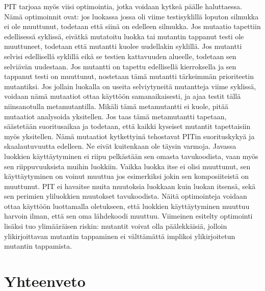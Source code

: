 \documentclass{tktltiki}
\begin{document}
PIT tarjoaa myös viisi optimointia, jotka voidaan kytkeä päälle haluttaessa. Nämä optimoinnit ovat: jos luokassa jossa oli viime testisyklillä loputon silmukka ei ole muuttunut, todetaan että siinä on edelleen silmukka. Jos mutaatio tapettiin edellisessä syklissä, eivätkä mutatoitu luokka tai mutantin tappanut testi ole muuttuneet, todetaan että mutantti kuolee uudellakin syklillä. Jos mutantti selvisi edellisellä syklillä eikä se testien kattavuuden alueelle, todetaan sen selviävän uudestaan. Jos mutantti on tapettu edellisellä kierroksella ja sen tappanut testi on muuttunut, nostetaan tämä mutantti tärkeimmän prioriteetin mutantiksi. Jos jollain luokalla on useita selviytyneitä mutantteja viime syklissä, voidaan nämä mutaatiot ottaa käyttöön samanaikaisesti, ja ajaa testit tällä niinsanotulla metamutantilla. Mikäli tämä metamutantti ei kuole, pitää mutaatiot analysoida yksitellen. Jos taas tämä metamutantti tapetaan, säästetään suoritusaikaa ja todetaan, että kaikki kyseiset mutantit tapettaisiin myös yksitellen. Nämä mutaatiot kytkettyinä tehostavat PITin suorituskykyä ja skaalautuvuutta edelleen. Ne eivät kuitenkaan ole täysin varmoja. Javassa luokkien käyttäytyminen ei riipu pelkästään sen omasta tavukoodista, vaan myös sen riippuvuuksista muihin luokkiin. Vaikka luokka itse ei olisi muuttunut, sen käyttäytyminen on voinut muuttua jos esimerkiksi jokin sen komposiiteistä on muuttunut. PIT ei havaitse muita muutoksia luokkaan kuin luokan itsensä, sekä sen perimien yliluokkien muutokset tavukoodista. Näitä optimointeja voidaan ottaa käyttöön luottamalla oletukseen, että luokkien käyttäytyminen muuttuu harvoin ilman, että sen oma lähdekoodi muuttuu. Viimeinen esitelty optimointi lisäksi tuo ylimääräisen riskin: mutantit voivat olla päälekkäisiä, jolloin ylikirjoittavan mutantin tappaminen ei välttämättä implikoi ylikirjoitetun mutantin tappamista.  

\section{Yhteenveto}
\end{document}
